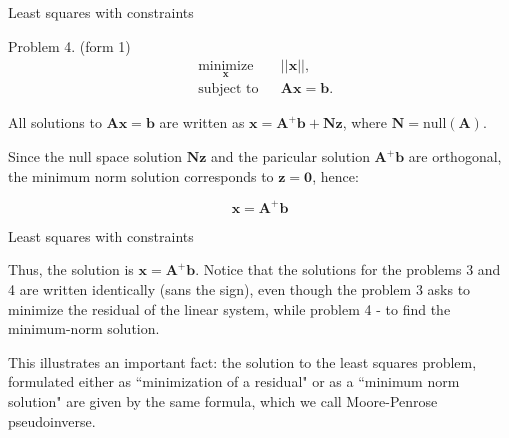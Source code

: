\documentclass{beamer}
\begin{document}
\begin{frame}{Least squares with constraints}
\begin{flushleft}


Problem 4. (form 1)
%
\begin{equation}
\begin{aligned}
& \underset{\mathbf{x}}{\text{minimize}}
& & || \mathbf{x} ||, \\
& \text{subject to}
& & \mathbf{A} \mathbf{x} = \mathbf{b}.
\end{aligned}
\end{equation}


All solutions to $\mathbf{A} \mathbf{x} = \mathbf{b}$ are written as $\mathbf{x} = \mathbf{A}^+\mathbf{b} + \mathbf{N}\mathbf{z}$, where $\mathbf{N} = \text{null}(\mathbf{A})$. 

\bigskip

Since the null space solution $\mathbf{N}\mathbf{z}$ and the paricular solution $\mathbf{A}^+\mathbf{b}$ are orthogonal, the minimum norm solution corresponds to $\mathbf{z} = \mathbf{0}$, hence:

\begin{equation}
	\mathbf{x} = \mathbf{A}^+\mathbf{b}
\end{equation}

\end{flushleft}
\end{frame}

\begin{frame}{Least squares with constraints}
\begin{flushleft}


Thus, the solution is  $\mathbf{x} = \mathbf{A}^+\mathbf{b}$. Notice that the solutions for the problems 3 and 4 are written identically (sans the sign), even though the problem 3 asks to minimize the residual of the linear system, while problem 4 - to find the minimum-norm solution. 

\bigskip

This illustrates an important fact: the solution to the least squares problem, formulated either as ``minimization of a residual" or as a ``minimum norm solution" are given by the same formula, which we call Moore-Penrose pseudoinverse.


\end{flushleft}
\end{frame}
\end{document}
